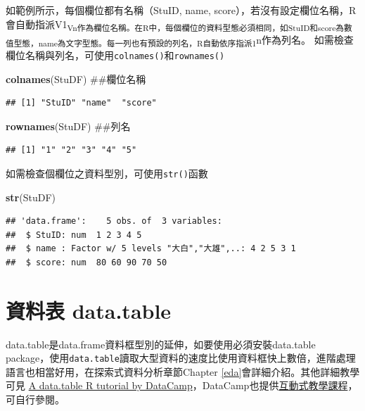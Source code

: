 \documentclass[]{book}
\newenvironment{Shaded}{\begin{snugshade}}{\end{snugshade}}
\newcommand{\KeywordTok}[1]{\textcolor[rgb]{0.13,0.29,0.53}{\textbf{{#1}}}}
\newcommand{\NormalTok}[1]{{#1}}
\theoremstyle{definition}
\theoremstyle{definition}
\theoremstyle{remark}
\begin{document}
如範例所示，每個欄位都有名稱（StuID, name,
score），若沒有設定欄位名稱，R會自動指派V1\textsubscript{Vn作為欄位名稱。在R中，每個欄位的資料型態必須相同，如StuID和score為數值型態，name為文字型態。每一列也有預設的列名，R自動依序指派1}n作為列名。
如需檢查欄位名稱與列名，可使用\texttt{colnames()}和\texttt{rownames()}

\begin{Shaded}
\begin{Highlighting}[]
\KeywordTok{colnames}\NormalTok{(StuDF) ##欄位名稱}
\end{Highlighting}
\end{Shaded}

\begin{verbatim}
## [1] "StuID" "name"  "score"
\end{verbatim}

\begin{Shaded}
\begin{Highlighting}[]
\KeywordTok{rownames}\NormalTok{(StuDF) ##列名}
\end{Highlighting}
\end{Shaded}

\begin{verbatim}
## [1] "1" "2" "3" "4" "5"
\end{verbatim}

如需檢查個欄位之資料型別，可使用\texttt{str()}函數

\begin{Shaded}
\begin{Highlighting}[]
\KeywordTok{str}\NormalTok{(StuDF) }
\end{Highlighting}
\end{Shaded}

\begin{verbatim}
## 'data.frame':    5 obs. of  3 variables:
##  $ StuID: num  1 2 3 4 5
##  $ name : Factor w/ 5 levels "大白","大雄",..: 4 2 5 3 1
##  $ score: num  80 60 90 70 50
\end{verbatim}

\section{資料表 data.table}\label{-data.table}

data.table是data.frame資料框型別的延伸，如要使用必須安裝data.table
\citep{R-data.table}
package，使用\texttt{data.table}讀取大型資料的速度比使用資料框快上數倍，進階處理語言也相當好用，在探索式資料分析章節Chapter
\ref{eda}會詳細介紹。其他詳細教學可見
\href{https://www.datacamp.com/community/tutorials/data-table-r-tutorial\#gs.vzMYa_k}{A
data.table R tutorial by
DataCamp}，DataCamp也提供\href{https://www.datacamp.com/courses/data-table-data-manipulation-r-tutorial}{互動式教學課程}，可自行參閱。
\end{document}
